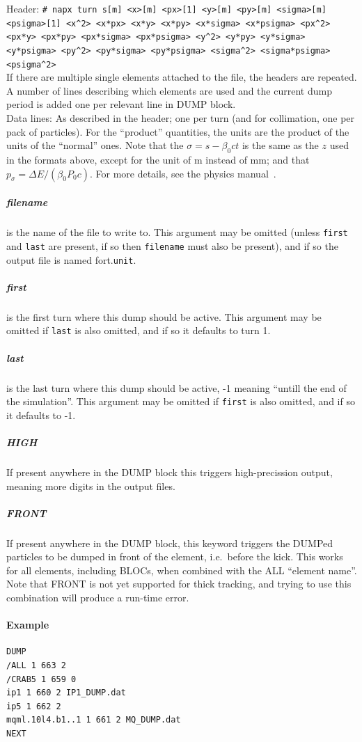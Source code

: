 \documentclass[a4paper,11pt]{report}
\begin{document}
\begin{enumerate}
	Header: \texttt{\# napx turn s[m] <x>[m] <px>[1] <y>[m] <py>[m] <sigma>[m] <psigma>[1] <x\^{}2> <x*px> <x*y> <x*py> <x*sigma> <x*psigma> <px\^{}2> <px*y> <px*py> <px*sigma> <px*psigma> <y\^{}2> <y*py> <y*sigma> <y*psigma> <py\^{}2> <py*sigma> <py*psigma> <sigma\^{}2> <sigma*psigma> <psigma\^{}2>}\\
        If there are multiple single elements attached to the file, the headers are repeated.\\
	A number of lines describing which elements are used and the current dump period is added one per relevant line in DUMP block.\\
	Data lines: As described in the header; one per turn (and for collimation, one per pack of particles).
        For the ``product'' quantities, the units are the product of the units of the ``normal'' ones.
        Note that the $\sigma=s -\beta_0 c t$ is the same as the $z$ used in the formats above, except for the unit of m instead of mm; and that $p_\sigma = \Delta E / \left(\beta_0 P_0 c\right)$.
        For more details, see the physics manual~\cite{sixphys}.
\end{enumerate}

\subparagraph{filename} is the name of the file to write to. This argument may be omitted (unless \texttt{first} and \texttt{last} are present, if so then \texttt{filename} must also be present), and if so the output file is named fort.\texttt{unit}.

\subparagraph{first} is the first turn where this dump should be active. This argument may be omitted if \texttt{last} is also omitted, and if so it defaults to turn 1.

\subparagraph{last} is the last turn where this dump should be active, -1 meaning ``untill the end of the simulation''. This argument may be omitted if \texttt{first} is also omitted, and if so it defaults to -1.

\subparagraph{HIGH} If present anywhere in the DUMP block this triggers high-precission output, meaning more digits in the output files.

\subparagraph{FRONT} If present anywhere in the DUMP block, this keyword triggers the DUMPed particles to be dumped in front of the element, i.e.\ before the kick.
This works for all elements, including BLOCs, when combined with the ALL ``element name''.
Note that FRONT is not yet supported for thick tracking, and trying to use this combination will produce a run-time error.

\paragraph{Example}
\begin{verbatim}
DUMP
/ALL 1 663 2
/CRAB5 1 659 0
ip1 1 660 2 IP1_DUMP.dat
ip5 1 662 2
mqml.10l4.b1..1 1 661 2 MQ_DUMP.dat
NEXT
\end{verbatim}
\end{document}
